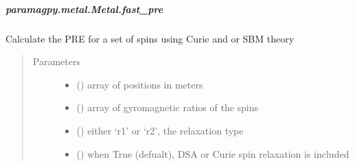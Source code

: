 \documentclass[a4paper,10pt,english,openany,oneside]{sphinxmanual}
\begin{document}
\begin{fulllineitems}
\begin{fulllineitems}
\begin{fulllineitems}
\begin{quote}
\begin{description}
\end{description}\end{quote}

\end{fulllineitems}



\subparagraph{paramagpy.metal.Metal.fast\_pre}
\label{\detokenize{reference/generated/paramagpy.metal.Metal.fast_pre:paramagpy-metal-metal-fast-pre}}\label{\detokenize{reference/generated/paramagpy.metal.Metal.fast_pre::doc}}

\begin{fulllineitems}
\label{\detokenize{reference/generated/paramagpy.metal.Metal.fast_pre:paramagpy.metal.Metal.fast_pre}}
Calculate the PRE for a set of spins using Curie and or SBM theory
\begin{quote}\begin{description}
\item[{Parameters}] \leavevmode\begin{itemize}
\item {} 
 (\sphinxstyleliteralemphasis{\sphinxupquote{ (}}\sphinxstyleliteralemphasis{\sphinxupquote{,}}\sphinxstyleliteralemphasis{\sphinxupquote{)}}) \textendash{} array of positions in meters

\item {} 
 (\sphinxstyleliteralemphasis{\sphinxupquote{ (}}\sphinxstyleliteralemphasis{\sphinxupquote{,}}\sphinxstyleliteralemphasis{\sphinxupquote{)}}) \textendash{} array of gyromagnetic ratios of the spins

\item {} 
 () \textendash{} either ‘r1’ or ‘r2’, the relaxation type

\item {} 
 (\sphinxstyleliteralemphasis{\sphinxupquote{ (}}\sphinxstyleliteralemphasis{\sphinxupquote{)}}) \textendash{} when True (defualt), DSA or Curie spin relaxation is included


\end{itemize}
\end{description}
\end{quote}
\end{fulllineitems}
\end{fulllineitems}
\end{fulllineitems}
\end{document}
